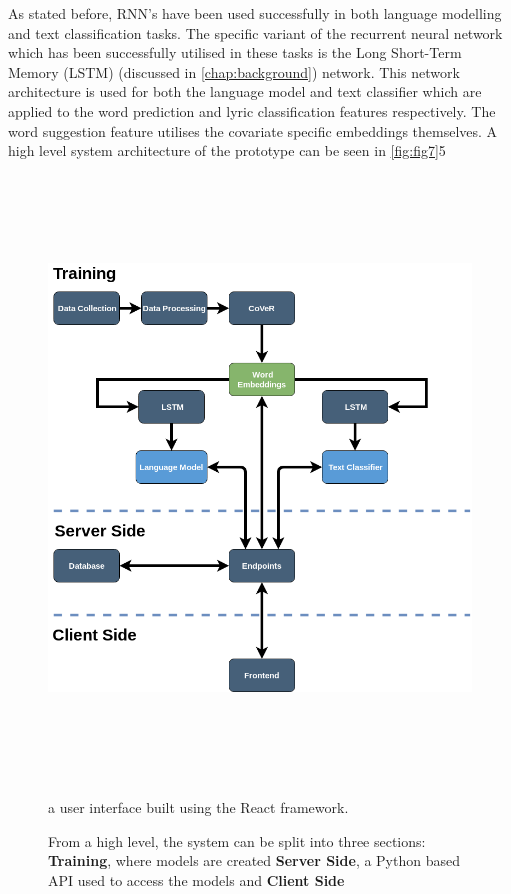 \noindent
\newline
As stated before, RNN's have been used successfully in both language modelling and text classification tasks. The specific variant of the recurrent neural network which has been successfully utilised in these tasks is the Long Short-Term Memory (LSTM) (discussed in \autoref{chap:background}) network. This network architecture is used for both the language model and text classifier which are applied to the word prediction and lyric classification features respectively. The word suggestion feature utilises the covariate specific embeddings themselves. A high level system architecture of the prototype can be seen in \autoref{fig:fig7}5
\begin{figure}[h]	
	\includegraphics[width=15cm, height=16cm]{./figures/fig7}
	\centering
	\caption[SONGIFAI: High Level Architecture]{From a high level, the system can be split into three sections: \textbf{Training}, where models are created \textbf{Server Side}, a Python based API used to access the models and \textbf{Client Side}} a user interface built using the React framework.
	\label{fig:fig7}
\end{figure}
